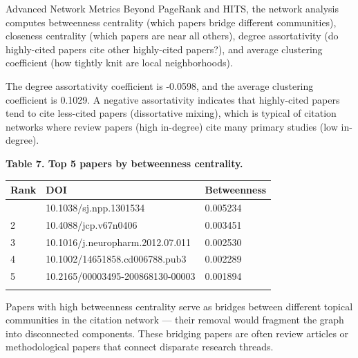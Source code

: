 \documentclass[
  ignorenonframetext,
]{beamer}
\newcounter{none} %
\begin{document}
\begin{frame}[allowframebreaks]{Advanced Network Metrics}
\protect{}\label{advanced-network-metrics}
Beyond PageRank and HITS, the network analysis computes betweenness
centrality (which papers bridge different communities), closeness
centrality (which papers are near all others), degree assortativity (do
highly-cited papers cite other highly-cited papers?), and average
clustering coefficient (how tightly knit are local neighborhoods).

The degree assortativity coefficient is -0.0598, and the average
clustering coefficient is 0.1029. A negative assortativity indicates
that highly-cited papers tend to cite less-cited papers (dissortative
mixing), which is typical of citation networks where review papers (high
in-degree) cite many primary studies (low in-degree).

\textbf{Table 7. Top 5 papers by betweenness centrality.}

{\def\LTcaptype{none} %
\begin{longtable}[]{@{}lll@{}}
\toprule\noalign{}
Rank & DOI & Betweenness \\
\midrule\noalign{}
\endhead
1 & 10.1038/sj.npp.1301534 & 0.005234 \\
2 & 10.4088/jcp.v67n0406 & 0.003451 \\
3 & 10.1016/j.neuropharm.2012.07.011 & 0.002530 \\
4 & 10.1002/14651858.cd006788.pub3 & 0.002289 \\
5 & 10.2165/00003495-200868130-00003 & 0.001894 \\
\bottomrule\noalign{}
\end{longtable}
}

Papers with high betweenness centrality serve as bridges between
different topical communities in the citation network --- their removal
would fragment the graph into disconnected components. These bridging
papers are often review articles or methodological papers that connect
disparate research threads.
\end{frame}
\end{document}
